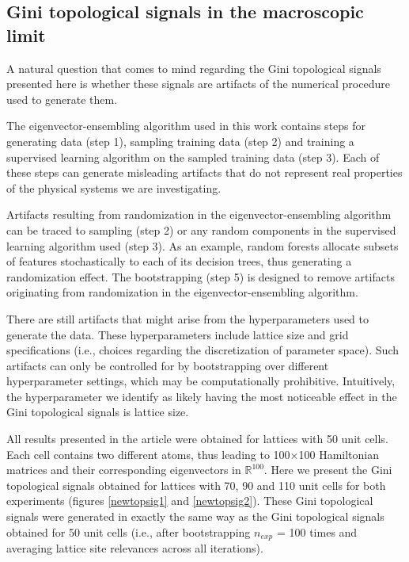 \documentclass[fleqn,10pt]{wlscirep}
\begin{document}
\subsection*{Gini topological signals in the macroscopic limit}

A natural question that comes to mind regarding the Gini topological signals presented here is whether these signals are artifacts of the numerical procedure used to generate them.

The eigenvector-ensembling algorithm used in this work contains steps for generating data (step 1), sampling training data (step 2) and training a supervised learning algorithm on the sampled training data (step 3). Each of these steps can generate misleading artifacts that do not represent real properties of the physical systems we are investigating.

Artifacts resulting from randomization in the eigenvector-ensembling algorithm can be traced to sampling (step 2) or any random components in the supervised learning algorithm used (step 3). As an example, random forests allocate subsets of features stochastically to each of its decision trees, thus generating a randomization effect. The bootstrapping (step 5) is designed to remove artifacts originating from randomization in the eigenvector-ensembling algorithm.

There are still artifacts that might arise from the hyperparameters used to generate the data. These hyperparameters include lattice size and grid specifications (i.e., choices regarding the discretization of parameter space). Such artifacts can only be controlled for by bootstrapping over different hyperparameter settings, which may be computationally prohibitive. Intuitively, the hyperparameter we identify as likely having the most noticeable effect in the Gini topological signals is lattice size.

All results presented in the article were obtained for lattices with 50 unit cells. Each cell contains two different atoms, thus leading to 100$\times$100 Hamiltonian matrices and their corresponding eigenvectors in $\mathbb{R}^{100}$. Here we present the Gini topological signals obtained for lattices with 70, 90 and 110 unit cells for both experiments (figures \ref{newtopsig1} and \ref{newtopsig2}). These Gini topological signals were generated in exactly the same way as the Gini topological signals obtained for 50 unit cells (i.e., after bootstrapping $n_{exp}$ = 100 times and averaging lattice site relevances across all iterations).
\end{document}
